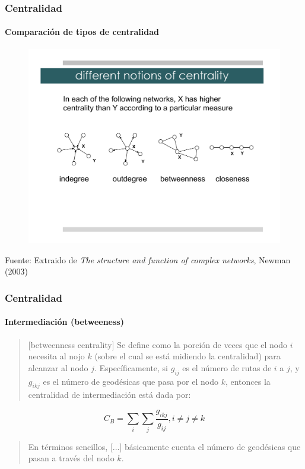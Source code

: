 \documentclass[10pt,handout]{beamer}
\begin{document}
\begin{frame}
\frametitle{Centralidad}
\framesubtitle{Comparaci\'on de tipos de centralidad}
\begin{figure}
\includegraphics[trim=2cm 6cm 2cm 4cm, clip=true, width=\linewidth]{Lecture3Acentrality_comparison.pdf}
\end{figure}
{\footnotesize Fuente: Extraido de \emph{The structure and function of complex networks}, Newman (2003) \cite{newman2003structure}}
\end{frame}

\begin{frame}
\frametitle{Centralidad}
\framesubtitle{Intermediaci\'on (betweeness)}

\begin{quote}
[betweenness centrality] Se define como la porci\'on de veces que el nodo $i$ necesita al nojo $k$ (sobre
el cual se est\'a midiendo la centralidad) para alcanzar al nodo $j$.
Espec\'ificamente, si $g_{ij}$ es el n\'umero de rutas de $i$ a $j$, y $g_{ikj}$
es el n\'umero de geod\'esicas que pasa por el nodo $k$, entonces la centralidad
de intermediaci\'on est\'a dada por: 
\end{quote}

\begin{equation}
C_B=\sum_i\sum_j{\frac{g_{ikj}}{g_{ij}}}, i \neq j \neq k
\end{equation}

\begin{quote}
En t\'erminos sencillos, [...] b\'asicamente cuenta el n\'umero de geod\'esicas
que pasan a trav\'es del nodo $k$. \cite{borgatti2005centrality}
\end{quote}
\end{frame}
\end{document}
